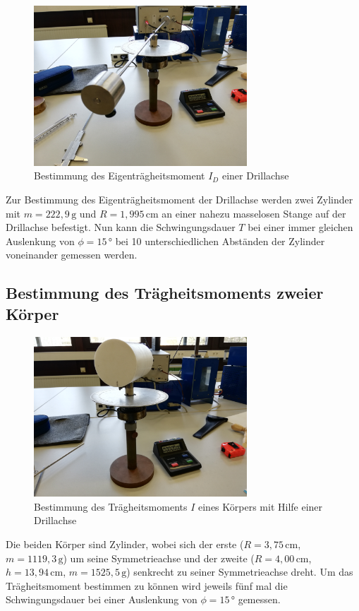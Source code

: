 \begin{figure}[H]
    \centering
    \includegraphics[width=8cm]{content/2.jpg}
    \caption{Bestimmung des Eigenträgheitsmoment $I_D$ einer Drillachse}
    \label{fig:b}
\end{figure}

\noindent Zur Bestimmung des Eigenträgheitsmoment der
Drillachse werden zwei Zylinder mit $m=222,9\,\si{\gram}$ und $R=1,995\,\si{\centi\meter}$ an einer nahezu
masselosen Stange auf der Drillachse befestigt. Nun
kann die Schwingungsdauer $T$ bei einer immer gleichen
Auslenkung von $\phi=15\,\si{\degree}$ bei 10 unterschiedlichen Abständen der
Zylinder voneinander gemessen werden.



\subsection{Bestimmung des Trägheitsmoments zweier Körper}
\begin{figure}[H]
    \centering
    \includegraphics[width=8cm]{content/3.jpg}
    \caption{Bestimmung des Trägheitsmoments $I$ eines Körpers mit Hilfe einer Drillachse}
    \label{fig:b}
\end{figure}
Die beiden Körper sind Zylinder, wobei sich der erste 
($R=3,75\,\si{\centi\meter}$, $m=1119,3\,\si{\gram}$)
um seine Symmetrieachse und der zweite 
($R=4,00\,\si{\centi\meter}$, $h=13,94\,\si{\centi\meter}$, $m=1525,5\,\si{\gram}$)
senkrecht zu seiner Symmetrieachse dreht. Um
das Trägheitsmoment bestimmen zu können wird jeweils
fünf mal die Schwingungsdauer bei einer Auslenkung
von $\phi=15\,\si{\degree}$ gemessen.


